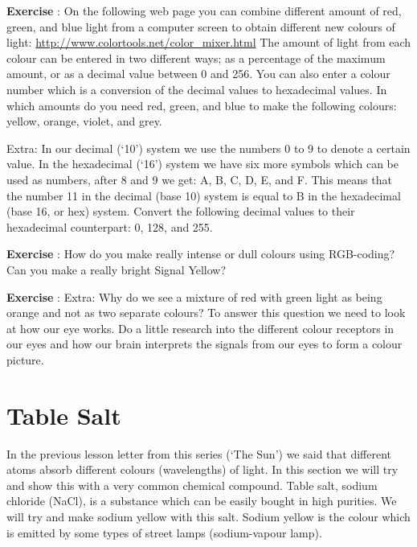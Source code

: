 \documentclass[12pt,a4paper]{article}
\numberwithin{equation}{section}
\numberwithin{figure}{section}
\newcounter{Exercise}
\numberwithin{table}{section}
\begin{document}
\begin{shaded}
\textbf{Exercise \theExercise {}} : On the following web page you can combine different amount of red, green, and blue light from a computer screen to obtain different new colours of light: \url{http://www.colortools.net/color_mixer.html}
The amount of light from each colour can be entered in two different ways; as a percentage of the maximum amount, or as a decimal value between 0 and 256. You can also enter a colour number which is a conversion of the decimal values to hexadecimal values.
In which amounts do you need red, green, and blue to make the following colours: yellow, orange, violet, and grey.

Extra: In our decimal (`10') system we use the numbers 0 to 9 to denote a certain value. In the hexadecimal (`16') system we have six more symbols which can be used as numbers, after 8 and 9 we get: A, B, C, D, E, and F. This means that the number 11 in the decimal (base 10) system is equal to B in the hexadecimal (base 16, or hex) system. Convert the following decimal values to their hexadecimal counterpart: 0, 128, and 255.\end{shaded}
\begin{shaded}
\textbf{Exercise \theExercise {}} : How do you make really intense or dull colours using RGB-coding? Can you make a really bright Signal Yellow?\end{shaded}
\begin{shaded}
\textbf{Exercise \theExercise {}} : Extra: Why do we see a mixture of red with green light as being orange and not as two separate colours? To answer this question we need to look at how our eye works. Do a little research into the different colour receptors in our eyes and how our brain interprets the signals from our eyes to form a colour picture.\end{shaded}


\section{Table Salt}
In the previous lesson letter from this series (`The Sun') we said that different atoms absorb different colours (wavelengths) of light. In this section we will try and show this with a very common chemical compound. Table salt, sodium chloride (NaCl), is a substance which can be easily bought in high purities. We will try and make sodium yellow with this salt. Sodium yellow is the colour which is emitted by some types of street lamps (sodium-vapour lamp).
\end{document}
